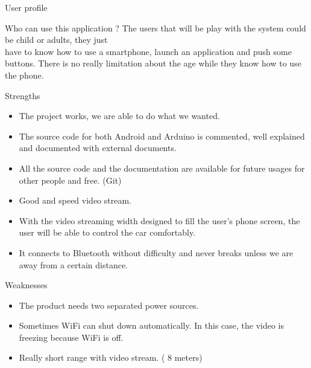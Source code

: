 \documentclass[xcolor=table, 9pt]{beamer}
\begin{document}
\begin{frame}{User profile}
\begin{block}{Who can use this application ?}
The users that will be play with the system could be child or adults, they just\\ \vspace{0.2cm}
have to know how to use a smartphone, launch an application and push some\\ \vspace{0.2cm} buttons. There is no really limitation about the age while they know how to use\\ \vspace{0.2cm} the phone.
\end{block}
\end{frame}


\begin{frame}{Strengths}
\begin{itemize}
\item The project works, we are able to do what we wanted.
\vspace{0.2cm}
\item The source code for both Android and Arduino is commented, well explained and documented with
external documents.
\vspace{0.2cm}
\item All the source code and the documentation are available for future usages for other people and free. (Git)
\vspace{0.2cm}
\item Good and speed video stream.
\vspace{0.2cm}
\item With the video streaming width designed to fill the user’s phone screen, the user will be able to control the car comfortably.
\vspace{0.2cm}
\item It connects to Bluetooth without difficulty and never breaks unless we are away from a certain distance.
\end{itemize}
\end{frame}

\begin{frame}{Weaknesses}
\begin{itemize}
\item The product needs two separated power sources.
\vspace{0.2cm}
\item Sometimes WiFi can shut down automatically. In this case, the video is freezing because WiFi is off.
\vspace{0.2cm}
\item Really short range with video stream. ( 8 meters)
\end{itemize}

\end{frame}
\end{document}
